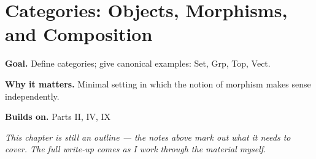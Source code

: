 \chapter{Categories: Objects, Morphisms, and Composition}
\label{ch:13-category-theory-and-universal-structures-01}

\begin{chapterintro}
\textbf{Goal.} Define categories; give canonical examples: Set, Grp, Top, Vect.

\textbf{Why it matters.} Minimal setting in which the notion of morphism makes sense independently.

\textbf{Builds on.} Parts II, IV, IX
\end{chapterintro}

\textit{This chapter is still an outline --- the notes above mark out what it needs to cover. The full write-up comes as I work through the material myself.}
